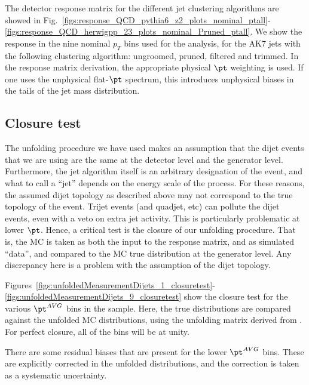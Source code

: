 The detector response matrix for the different jet clustering algorithms are showed in Fig.~\ref{figs:response_QCD_pythia6_z2_plots_nominal_ptall}-\ref{figs:response_QCD_herwigpp_23_plots_nominal_Pruned_ptall}. 
We show the response in the nine nominal $p_T$ bins used for the analysis, for the AK7 jets with the 
following clustering algorithm: ungroomed, pruned, filtered and trimmed.
In the response matrix derivation, the appropriate physical $\pt$ weighting is
used. If one uses the unphysical flat-$\pt$ spectrum, this introduces
unphysical biases in the tails of the jet mass distribution. 




\clearpage

\subsection{Closure test}

\label{sec:closure}

The unfolding procedure we have used makes an assumption that
the dijet events that we are using are the same at the detector
level and the generator level. Furthermore, the jet algorithm
itself is an arbitrary designation of the event, and what to
call a ``jet'' depends on the energy scale of the process.
For these reasons, the assumed dijet topology as described
above may not correspond to the true topology of the event.
Trijet events (and quadjet, etc) can pollute the dijet
events, even with a veto on extra jet activity. This is 
particularly problematic at lower $\pt$. Hence, a critical test
is the closure of our unfolding procedure. That is,
the MC is taken as both the input to the response matrix,
and as simulated ``data'', and compared to the MC true
distribution at the generator level. Any discrepancy here
is a problem with the assumption of the dijet topology.

Figures~\ref{figs:unfoldedMeasurementDijets_1_closuretest}-
\ref{figs:unfoldedMeasurementDijets_9_closuretest}
show the closure test for the various $\pt^{AVG}$ bins
in the sample. Here, the \PYTHIA true distributions
are compared against the unfolded \PYTHIA MC distributions,
using the unfolding matrix derived from \PYTHIA. For perfect
closure, all of the bins will be at unity. 

There are some residual biases that are present for the 
lower ${\pt}^{AVG}$ bins. These are explicitly corrected
in the unfolded distributions, and the correction is
taken as a systematic uncertainty. 




